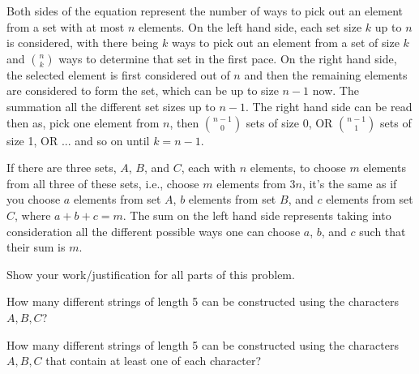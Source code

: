 \documentclass[11pt]{article}
\begin{document}
\begin{solution}
    \begin{Parts}
        
        \Part Both sides of the equation represent the number of ways to pick out
        an element from a set with at most $n$ elements. On the left hand side, 
        each set size $k$ up to $n$ is considered, with there being $k$ ways to
        pick out an element from a set of size $k$ and $\binom{n}{k}$ ways to 
        determine that set in the first pace. On the right hand side, the selected
        element is first considered out of $n$ and then the remaining elements are
        considered to form the set, which can be up to size $n-1$ now. The
        summation all the different set sizes up to $n-1$. The right hand side can
        be read then as, pick one element from $n$, then $\binom{n-1}{0}$ sets of
        size 0, OR $\binom{n-1}{1}$ sets of size 1, OR ... and so on until $k = n-1$.


        \Part If there are three sets, $A$, $B$, and $C$, each with $n$ elements, to
        choose $m$ elements from all three of these sets, i.e., choose $m$ elements
        from $3n$, it's the same as if you choose $a$ elements from set $A$, $b$ 
        elements from set $B$, and $c$ elements from set $C$, where $a + b + c = m$.
        The sum on the left hand side represents taking into consideration all the 
        different possible ways one can choose $a$, $b$, and $c$ such that their
        sum is $m$.

    \end{Parts}
\end{solution}


Show your work/justification for all parts of this problem.
\begin{Parts}
    \Part How many different strings of length 5 can be constructed using the 
    characters $A, B, C$?

    \Part How many different strings of length 5 can be constructed using the 
    characters $A, B, C$ that contain at least one of each character?

\end{Parts}
\end{document}
